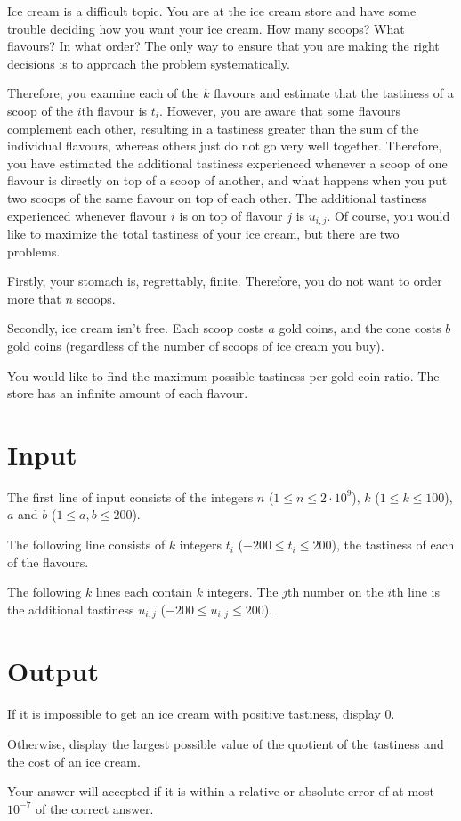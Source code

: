Ice cream is a difficult topic. You are at the ice cream store and have some trouble deciding how you want your ice cream. How many scoops? What flavours? In what order? The only way to ensure that you are making the right decisions is to approach the problem systematically.

Therefore, you examine each of the $k$ flavours and estimate that the tastiness of a scoop of the $i$th flavour is $t_i$. However, you are aware that some flavours complement each other, resulting in a tastiness greater than the sum of the individual flavours, whereas others just do not go very well together. Therefore, you have estimated the additional tastiness experienced whenever a scoop of one flavour is directly on top of a scoop of another, and what happens when you put two scoops of the same flavour on top of each other. The additional tastiness experienced whenever flavour $i$ is on top of flavour $j$ is $u_{i,j}$.
Of course, you would like to maximize the total tastiness of your ice cream, but there are two problems.

Firstly, your stomach is, regrettably, finite. Therefore, you do not want to order more that $n$ scoops.

Secondly, ice cream isn't free. Each scoop costs $a$ gold coins, and the cone costs $b$ gold coins (regardless of the number of scoops of ice cream you buy).

You would like to find the maximum possible tastiness per gold coin ratio. The store has an infinite amount of each flavour.

\section*{Input}
The first line of input consists of the integers $n$ ($1 \leq n \leq 2 \cdot 10^9$), $k$ ($1 \leq k \leq 100$), $a$ and $b$ ($1 \leq a,b \leq 200$).

The following line consists of $k$ integers $t_i$ ($-200 \leq t_i \leq 200$), the tastiness of each of the flavours.

The following $k$ lines each contain $k$ integers. The $j$th number on the $i$th line is the additional tastiness $u_{i,j}$ ($-200 \leq u_{i,j} \leq 200$).

\section*{Output}
If it is impossible to get an ice cream with positive tastiness, display $0$.

Otherwise, display the largest possible value of the quotient of the tastiness and the cost of an ice cream.

Your answer will accepted if it is within a relative or absolute error of at most $10^{-7}$ of the correct answer.
